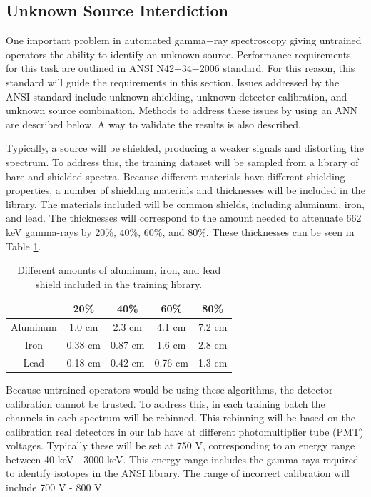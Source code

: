 \documentclass[tocnosub,noragright,centerchapter,12pt,fullpage]{uiucecethesis09}
\begin{document}
\subsection{Unknown Source Interdiction} \label{UnknownSourceInterdiction}

One important problem in automated gamma$-$ray spectroscopy giving untrained operators the ability to identify an unknown source. Performance requirements for this task are outlined in ANSI N42$-$34$-$2006 standard. For this reason, this standard will guide the requirements in this section. Issues addressed by the ANSI standard include unknown shielding, unknown detector calibration, and unknown source combination. Methods to address these issues by using an ANN are described below. A way to validate the results is also described. 

Typically, a source will be shielded, producing a weaker signals and distorting the spectrum. To address this, the training dataset will be sampled from a library of bare and shielded spectra. Because different materials have different shielding properties, a number of shielding materials and thicknesses will be included in the library. The materials included will be common shields, including aluminum, iron, and lead. The thicknesses will correspond to the amount needed to attenuate 662 keV gamma-rays by 20\%, 40\%, 60\%, and 80\%. These thicknesses can be seen in Table \ref{table:Shielding_to_include}.

\begin{table}[H]
\centering
\caption{Different amounts of aluminum, iron, and lead shield included in the training library.}
\label{table:Shielding_to_include}
\begin{tabular}{c|c|c|c|c|}
\cline{2-5}
                               & 20\% & 40\% & 60\% & 80\% \\ \hline
\multicolumn{1}{|c|}{Aluminum} & 1.0 cm  & 2.3 cm  & 4.1 cm & 7.2 cm \\ \hline
\multicolumn{1}{|c|}{Iron}     & 0.38 cm  & 0.87 cm  & 1.6 cm & 2.8 cm  \\ \hline
\multicolumn{1}{|c|}{Lead}     & 0.18 cm  & 0.42 cm  & 0.76 cm  & 1.3 cm \\ \hline
\end{tabular}
\end{table}


Because untrained operators would be using these algorithms, the detector calibration cannot be trusted. To address this, in each training batch the channels in each spectrum will be rebinned. This rebinning will be based on the calibration real detectors in our lab have at different photomultiplier tube (PMT) voltages. Typically these will be set at 750 V, corresponding to an energy range between 40 keV - 3000 keV. This energy range includes the gamma-rays required to identify isotopes in the ANSI library. The range of incorrect calibration will include 700 V - 800 V.
\end{document}
